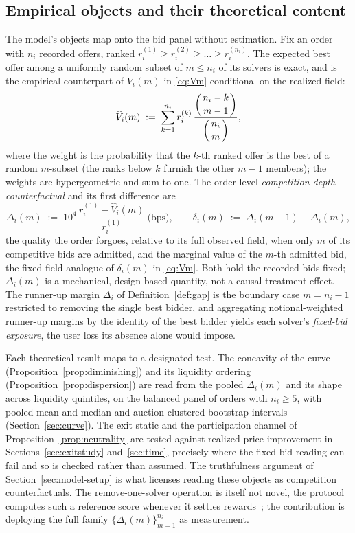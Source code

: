 \documentclass[11pt]{article}
\theoremstyle{plain}
\theoremstyle{definition}
\theoremstyle{remark}
\begin{document}
\subsection{Empirical objects and their theoretical content}\label{sec:model-objects}
The model's objects map onto the bid panel without estimation. Fix an order with $n_i$ recorded offers, ranked $r_i^{(1)}\ge r_i^{(2)}\ge\dots\ge r_i^{(n_i)}$. The expected best offer among a uniformly random subset of $m\le n_i$ of its solvers is exact, and is the empirical counterpart of $V_i(m)$ in \eqref{eq:Vm} conditional on the realized field:
\begin{equation}\label{eq:subset}
\widehat V_i(m) \;:=\; \sum_{k=1}^{n_i} r_i^{(k)}\,\frac{\dbinom{n_i-k}{\,m-1\,}}{\dbinom{n_i}{\,m\,}},
\end{equation}
where the weight is the probability that the $k$-th ranked offer is the best of a random $m$-subset (the ranks below $k$ furnish the other $m-1$ members); the weights are hypergeometric and sum to one. The order-level \emph{competition-depth counterfactual} and its first difference are
\begin{equation}\label{eq:delta}
\Delta_i(m) \;:=\; 10^4\,\frac{r_i^{(1)}-\widehat V_i(m)}{r_i^{(1)}}\ \text{(bps)},
\qquad
\delta_i(m) \;:=\; \Delta_i(m{-}1)-\Delta_i(m),
\end{equation}
the quality the order forgoes, relative to its full observed field, when only $m$ of its competitive bids are admitted, and the marginal value of the $m$-th admitted bid, the fixed-field analogue of $\delta_i(m)$ in \eqref{eq:Vm}. Both hold the recorded bids fixed; $\Delta_i(m)$ is a mechanical, design-based quantity, not a causal treatment effect. The runner-up margin $\Delta_i$ of Definition~\ref{def:gap} is the boundary case $m=n_i{-}1$ restricted to removing the single best bidder, and aggregating notional-weighted runner-up margins by the identity of the best bidder yields each solver's \emph{fixed-bid exposure}, the user loss its absence alone would impose.

Each theoretical result maps to a designated test. The concavity of the curve (Proposition~\ref{prop:diminishing}) and its liquidity ordering (Proposition~\ref{prop:dispersion}) are read from the pooled $\Delta_i(m)$ and its shape across liquidity quintiles, on the balanced panel of orders with $n_i\ge 5$, with pooled mean and median and auction-clustered bootstrap intervals (Section~\ref{sec:curve}). The exit static and the participation channel of Proposition~\ref{prop:neutrality} are tested against realized price improvement in Sections~\ref{sec:exitstudy} and~\ref{sec:time}, precisely where the fixed-bid reading can fail and so is checked rather than assumed. The truthfulness argument of Section~\ref{sec:model-setup} is what licenses reading these objects as competition counterfactuals. The remove-one-solver operation is itself not novel, the protocol computes such a reference score whenever it settles rewards~\citep{cowdao_rewards}; the contribution is deploying the full family $\{\Delta_i(m)\}_{m=1}^{n_i}$ as measurement.
\end{document}
